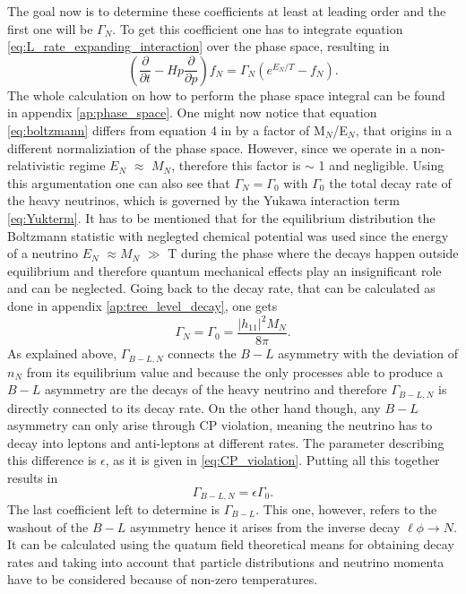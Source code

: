 The goal now is to determine these coefficients at least at leading order and the first one will be $\Gamma_N$. To get this coefficient one has to integrate equation \eqref{eq:L_rate_expanding_interaction} over the phase space, resulting in
\begin{equation}
	\left(\frac{\partial}{\partial t}-Hp\frac{\partial}{\partial p}\right)f_N=\Gamma_N\left(e^{E_N/T}-f_N\right).
	\label{eq:boltzmann}
\end{equation}
The whole calculation on how to perform the phase space integral can be found in appendix \ref{ap:phase_space}. \newline\indent
One might now notice that equation \eqref{eq:boltzmann} differs from equation 4 in \cite{Bodeker:2013qaa} by a factor of M$_N$/E$_N$, that origins in a different normaliziation of the phase space. However, since we operate in a non-relativistic regime $E_N$ $\approx$ $M_N$, therefore this factor is $\sim$ 1 and negligible. Using this argumentation one can also see that $\Gamma_N=\Gamma_0$ with $\Gamma_0$ the total decay rate of the heavy neutrinos, which is governed by the Yukawa interaction term \eqref{eq:Yukterm}. It has to be mentioned that for the equilibrium distribution the Boltzmann statistic with neglegted chemical potential was used since the energy of a neutrino $E_N$ $\approx M_N$ $\gg$ T during the phase where the decays happen outside equilibrium and therefore quantum mechanical effects play an insignificant role and can be neglected. Going back to the decay rate, that can be calculated as done in appendix \ref{ap:tree_level_decay}, one gets
\begin{equation}
\Gamma_N=\Gamma_0=\frac{|h_{11}|^2M_N}{8\pi}.
\label{eq:Gamma_N}
\end{equation}
As explained above, $\Gamma_{B-L,N}$ connects the $B-L$ asymmetry with the deviation of $n_N$ from its equilibrium value and because the only processes able to produce a $B-L$ asymmetry  are the decays of the heavy neutrino and therefore $\Gamma_{B-L,N}$ is directly connected to its decay rate. On the other hand though, any $B-L$ asymmetry can only arise through CP violation, meaning the neutrino has to decay into leptons and anti-leptons at different rates. The parameter describing this difference is $\epsilon$, as it is given in \eqref{eq:CP_violation}. Putting all this together results in 
\begin{equation}
	\Gamma_{B-L,N}=\epsilon\Gamma_0.
	\label{eq:Gamma_B-L,N}
\end{equation}
The last coefficient left to determine is $\Gamma_{B-L}$. This one, however, refers to the washout of the $B-L$ asymmetry hence it arises from the inverse decay $\ell\phi\rightarrow N$. It can be calculated using the quatum field theoretical means for obtaining decay rates and taking into account that particle distributions and neutrino momenta have to be considered because of non-zero temperatures.\cite[Eq. (10)]{Bodeker:2013qaa}
